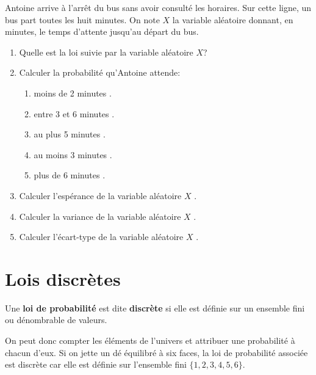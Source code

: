 \begin{exercice_cours}[\quad]{}
\bigskip

 Antoine arrive à l'arrêt du bus sans avoir consulté les horaires. Sur cette ligne, un bus part toutes les huit minutes. On note $X$ la variable aléatoire donnant, en minutes, le temps d'attente jusqu'au départ du bus.

\begin{enumerate}
	\item Quelle est la loi suivie par la variable aléatoire $X$?
	
\begin{blocvisiblex}[height=1.5]
{\quad}
\end{blocvisiblex}	
	\item Calculer la probabilité qu'Antoine attende:
	
	\begin{enumerate}
		\item moins de 2 minutes \hfill\reponseLigne[7cm]{}.
		\item entre 3 et 6 minutes \hfill\reponseLigne[7cm]{}.
		\item au plus 5 minutes \hfill\reponseLigne[7cm]{}.
		\item au moins 3 minutes \hfill\reponseLigne[7cm]{}.
		\item plus de 6 minutes \hfill\reponseLigne[7cm]{}.
	\end{enumerate}
	
	\item Calculer l'espérance de la variable aléatoire $X$ \hfill\reponseLigne[7cm]{}.
	\item Calculer la variance de la variable aléatoire $X$ \hfill\reponseLigne[7cm]{}.
	\item Calculer l'écart-type de la variable aléatoire $X$ \hfill\reponseLigne[7cm]{}.
\end{enumerate}
\end{exercice_cours}




\section{Lois discrètes}

\begin{propriete}{}
Une \textbf{loi de probabilité} est dite \textbf{discrète} si elle est définie sur un ensemble fini ou dénombrable de valeurs.

On peut donc compter les éléments de l'univers et attribuer une probabilité à chacun d'eux. Si on jette un dé équilibré à six faces, la loi de probabilité associée est discrète car elle est définie sur l'ensemble fini $\{1, 2, 3, 4, 5, 6\}$.
\end{propriete}

